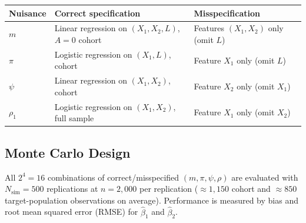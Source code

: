\begin{center}
\begin{tabular}{lll}
  \hline
  \textbf{Nuisance} & \textbf{Correct specification} & \textbf{Misspecification} \\
  \hline
  $m$      & Linear regression on $(X_1, X_2, L)$, $A=0$ cohort
           & Features $(X_1, X_2)$ only (omit $L$) \\
  $\pi$    & Logistic regression on $(X_1, L)$, cohort
           & Feature $X_1$ only (omit $L$) \\
  $\psi$   & Linear regression on $(X_1, X_2)$, cohort
           & Feature $X_2$ only (omit $X_1$) \\
  $\rho_1$ & Logistic regression on $(X_1, X_2)$, full sample
           & Feature $X_1$ only (omit $X_2$) \\
  \hline
\end{tabular}
\end{center}

\subsection*{Monte Carlo Design}

All $2^4 = 16$ combinations of correct/misspecified $(m, \pi, \psi, \rho)$
are evaluated with $N_{\mathrm{sim}} = 500$ replications at
$n = 2{,}000$ per replication ($\approx 1{,}150$ cohort and $\approx 850$
target-population observations on average).
Performance is measured by bias and root mean squared error (RMSE)
for $\hat\beta_1$ and $\hat\beta_2$.
